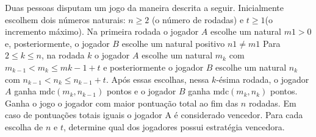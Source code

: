 Duas pessoas disputam um jogo da maneira descrita a seguir.
Inicialmente escolhem dois números naturais: $n \ge 2$ (o número de rodadas) e $t \ge 1$(o incremento máximo).
Na primeira rodada o jogador $A$ escolhe um natural $m1 > 0$ e, posteriormente, o jogador $B$ escolhe um natural positivo $n1 \neq m1$
Para $2 \le k \le n$, na rodada $k$ o jogador $A$ escolhe um natural $m_k$ com $m_{k - 1} < m_k \le m{k - 1} + t$ e posteriormente o jogador $B$ escolhe um natural $n_k$ com $n_{k - 1} < n_k \le n_{k - 1} + t$.
Após essas escolhas, nessa $k$-ésima rodada, o jogador $A$ ganha $\mathrm{mdc}(m_k, n_{k - 1})$ pontos e o jogador $B$ ganha $\mathrm{mdc}(m_k, n_k)$ pontos.
Ganha o jogo o jogador com maior pontuação total ao fim das $n$ rodadas.
Em caso de pontuações totais iguais o jogador A é considerado vencedor.
Para cada escolha de $n$ e $t$, determine qual dos jogadores possui estratégia vencedora.